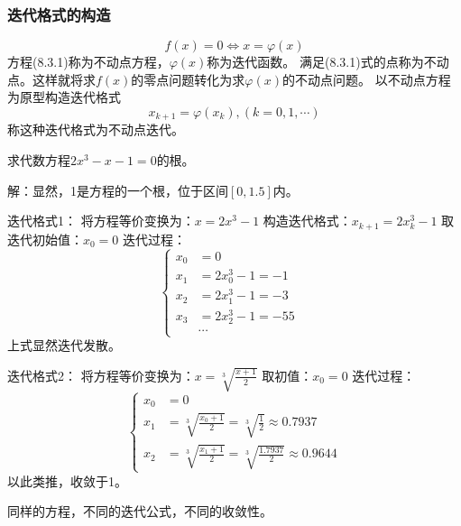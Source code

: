 \subsubsection{迭代格式的构造}
\begin{equation*}
    f(x) = 0 \Longleftrightarrow x = \varphi(x)
\end{equation*}
方程(8.3.1)称为不动点方程，$\varphi(x)$称为迭代函数。
满足(8.3.1)式的点称为不动点。这样就将求$f(x)$的零点问题转化为求$\varphi(x)$的不动点问题。
以不动点方程为原型构造迭代格式
\begin{equation*}
    x_{k+1} = \varphi(x_k),(k = 0,1,\cdots)
\end{equation*}
称这种迭代格式为不动点迭代。

\begin{example}
    求代数方程$2x^3-x-1 = 0$的根。
    \begin{solution}
        解：显然，1是方程的一个根，位于区间$[0,1.5]$内。

        迭代格式1：
        将方程等价变换为：$x = 2x^3-1$
        构造迭代格式：$x_{k+1} = 2x^3_k-1$
        取迭代初始值：$x_0 = 0$
        迭代过程：
        \begin{equation*}
            \left\{
                \begin{aligned}x_0 & =0 & \\
                x_1 & =2x_0^3-1=-1\\
                x_2 & =2x_1^3-1=-3\\
                x_3 & =2x_2^3-1=-55\\
                  & \cdots
                \end{aligned}
            \right.
        \end{equation*}
        上式显然迭代发散。

        迭代格式2：
        将方程等价变换为：$x = \sqrt[3]{\frac{x+1}{2}} $
        取初值：$x_0 = 0$
        迭代过程：
        \begin{equation*}
            \left\{
                \begin{aligned}
                    x_0 & =0\\
                    x_1 & =\sqrt[3]{\frac{x_0+1}2}=\sqrt[3]{\frac12}\approx0.7937\\
                    x_2 & =\sqrt[3]{\frac{x_1+1}2}=\sqrt[3]{\frac{1.7937}2}\approx0.9644
                \end{aligned}
            \right.
        \end{equation*}
        以此类推，收敛于1。
    \end{solution}
    \begin{notice}
        同样的方程，不同的迭代公式，不同的收敛性。
    \end{notice}
\end{example}

